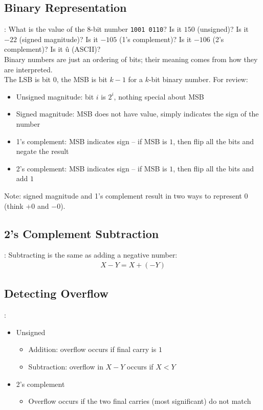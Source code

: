 \documentclass{../slides}
\begin{document}
\subsection{Binary Representation}
\begin{frame}{\secname: \subsecname}
    What is the value of the 8-bit number \lstinline{1001 0110}? Is it $150$ (unsigned)? Is it $-22$ (signed magnitude)? Is it $-105$ (1's complement)? Is it $-106$ (2's complement)? Is it \^{u} (ASCII)?\\
    Binary numbers are just an ordering of bits; their meaning comes from how they are interpreted.\\
    The LSB is bit $0$, the MSB is bit $k-1$ for a $k$-bit binary number. For review:
    \begin{itemize}
        \item Unsigned magnitude: bit $i$ is $2^i$, nothing special about MSB
        \item Signed magnitude: MSB does not have value, simply indicates the sign of the number
        \item 1's complement: MSB indicates sign -- if MSB is $1$, then flip all the bits and negate the result
        \item 2's complement: MSB indicates sign -- if MSB is $1$, then flip all the bits and add $1$
    \end{itemize}
    Note: signed magnitude and 1's complement result in two ways to represent $0$ (think $+0$ and $-0$).
\end{frame}

\subsection{2's Complement Subtraction}
\begin{frame}{\secname: \subsecname}
    Subtracting is the same as adding a negative number:
    \begin{gather*}
        X - Y = X + (-Y)
    \end{gather*}
\end{frame}

\subsection{Detecting Overflow}
\begin{frame}{\secname: \subsecname}
    \begin{itemize}
        \item Unsigned
        \begin{itemize}
            \item Addition: overflow occurs if final carry is $1$ 
            \item Subtraction: overflow in $X - Y$ occurs if $X < Y$
        \end{itemize}
        \item 2's complement
        \begin{itemize}
            \item Overflow occurs if the two final carries (most significant) do not match
        \end{itemize}
    \end{itemize}
\end{frame}
\end{document}
